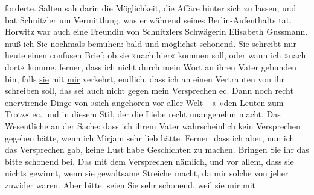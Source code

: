 \begin{ledgroupsized}[t]{13cm}
{{{                  forderte. Salten sah darin die Möglichkeit, die Affäre hinter sich zu lassen, 
                  und bat Schnitzler um Vermittlung, was er während seines Berlin-Aufenthalts tat. Horwitz war
                  auch eine Freundin von Schnitzlers Schwägerin Elisabeth Gussmann.}}}\label{K_L03339-3h} muß ich Sie
               nochmals bemühen: bald und möglichst schonend. Sie schreibt mir heute einen confusen Brief; ob sie »nach hier« kommen
               soll, oder wann ich »nach dort« komme, ferner, dass ich nicht durch mein Wort an
               ihren Vater gebunden bin,
               falls \uline{sie} mit \uline{mir}
               verkehrt, endlich, dass ich an einen Vertrauten von ihr schreiben soll, das sei auch
               nicht gegen mein Versprechen ec. Dann noch recht enervirende Dinge
               von »sich angehören vor aller {\pb}Welt –« »den Leuten zum Trotz« ec. und in diesem Stil, der die Liebe recht
               unangenehm macht.\pend
           \pstart
           Das Wesentliche an der Sache: dass ich ihrem Vater wahrscheinlich kein Versprechen gegeben hätte, wenn
               ich Mirjam sehr lieb hätte. Ferner: dass ich
               aber, nun ich das Versprechen gab, keine Lust habe Geschichten zu machen. Bringen Sie
               ihr das bitte schonend bei. D\textcolor{gray}{a}s mit dem Versprechen nämlich, und
               vor allem, dass sie nichts gewinnt, wenn sie gewaltsame Streiche macht, da mir solche
               von jeher zuwider waren. Aber bitte, seien Sie sehr schonend, weil sie mir mit

\end{ledgroupsized}
